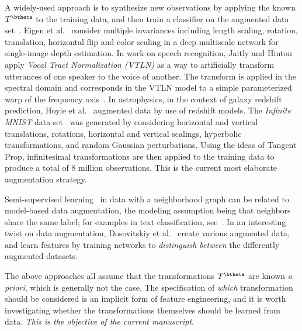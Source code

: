\documentclass[twoside]{article}
\newcommand{\OREN}[1]{\textbf{[Freifeld says: #1]}}
\begin{document}
  A widely-used approach is to synthesize new observations by applying
  the known $T^{\btheta}$ to the training data, and then train a classifier on
  the augmented data set~\cite{baird1992document,simard2003best,HintonImageNet2012,loosli:lskm:2007}.
  Eigen et al.~\cite{NIPS2014_5539} consider multiple invariances including length scaling,
  rotation, translation, horizontal flip and color scaling in a deep multiscale network
  for single-image depth estimation. In work on speech recognition, Jaitly and Hinton~\cite{jaitly2013vocal} apply
  \emph{Vocal Tract Normalization (VTLN)}
  as a way to artificially transform utterances of one speaker to the voice of another.
  The transform is applied in the spectral domain and corresponds
  in the VTLN model to a simple parameterized warp of the frequency axis~\cite{jaitly2013vocal}.
  In astrophysics, in the context of galaxy redshift prediction, Hoyle et al.~\cite{Hoyle:2015ada}
  augmented data by use of redshift models.
  The \emph{Infinite MNIST} data set~\cite{loosli:lskm:2007}
  was 
  generated by considering horizontal and vertical translations, rotations,
  horizontal and vertical scalings, hyperbolic transformations, and random Gaussian
  perturbations. Using the ideas
  of Tangent Prop, infinitesimal transformations are then applied to the training
  data to produce a total of 8 million observations. This is the current most elaborate
  augmentation strategy.
  
  Semi-supervised learning~\cite{chapelle2006semi} in data with a neighborhood
  graph can be related to model-based data augmentation,
  the modeling assumption
  being that neighbors share the same label; for examples in text classification, see~\cite{lu2006enhancing}. 
  In an interesting twist on data augmentation, Dosovitskiy et al.~\cite{dosovitskiy2013unsupervised}
  create various augmented data, and learn features by training networks to
  \emph{distinguish between} the differently augmented datasets.

  The above approaches all assume that the transformations $T^{\btheta}$ are known \emph{a priori},
  which is generally not the case. The specification of \emph{which} transformation
  should be considered is an implicit form of feature engineering, and it is worth
  investigating whether the transformations themselves should be learned from data.
  \emph{This is the objective of the current manuscript}.
  
\end{document}
